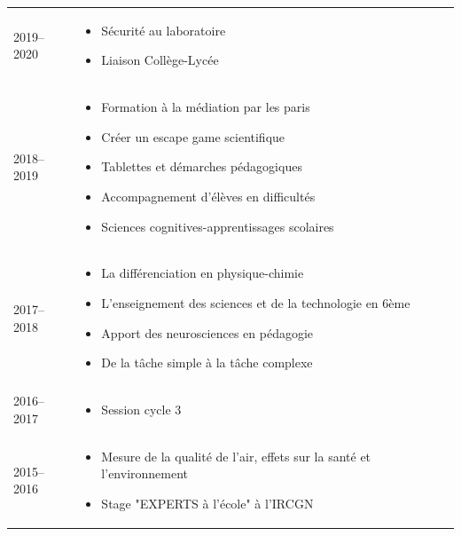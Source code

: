 \documentclass{../cv-style}     %
\begin{document}
\begin{tabular}{lp{11cm}}
    2019--2020 & %
        \vspace{-8pt}
        \begin{itemize}
            \item Sécurité au laboratoire
            \item Liaison Collège-Lycée
        \end{itemize} \vspace{-9pt} \\
    2018--2019 & %
        \vspace{-8pt}
        \begin{itemize}
            \item Formation à la médiation par les paris
            \item Créer un escape game scientifique
            \item Tablettes et démarches pédagogiques
            \item Accompagnement d'élèves en difficultés
            \item Sciences cognitives-apprentissages scolaires
        \end{itemize}\vspace{-9pt}\\
    2017--2018 & %
        \vspace{-8pt}
        \begin{itemize}
            \item La différenciation en physique-chimie
            \item L'enseignement des sciences et de la technologie en 6ème
            \item Apport des neurosciences en pédagogie
            \item De la tâche simple à la tâche complexe
        \end{itemize} \vspace{-9pt} \\
    2016--2017 & %
        \vspace{-8pt}
        \begin{itemize}
            \item Session cycle 3
        \end{itemize} \vspace{-9pt} \\
    2015--2016 & %
        \vspace{-8pt}
        \begin{itemize}
            \item Mesure de la qualité de l'air, effets sur la santé et l'environnement
            \item Stage "EXPERTS à l'école" à l'IRCGN
        \end{itemize} \\
\end{tabular}
\end{document}
